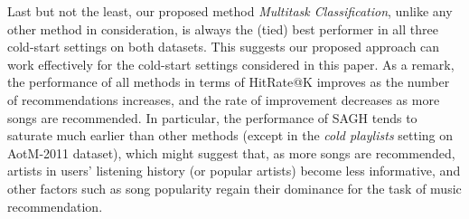 Last but not the least, our proposed method {\it Multitask Classification}, unlike any other method in consideration,
is always the (tied) best performer in all three cold-start settings on both datasets.
This suggests our proposed approach can work effectively for the cold-start settings considered in this paper.
As a remark, the performance of all methods in terms of HitRate@K improves as the number of recommendations increases,
and the rate of improvement decreases as more songs are recommended.
In particular, the performance of SAGH tends to saturate much earlier than other methods 
(except in the \emph{cold playlists} setting on AotM-2011 dataset),
which might suggest that, as more songs are recommended, artists in users' listening history (or popular artists) become less informative,
and other factors such as song popularity regain their dominance for the task of music recommendation.
